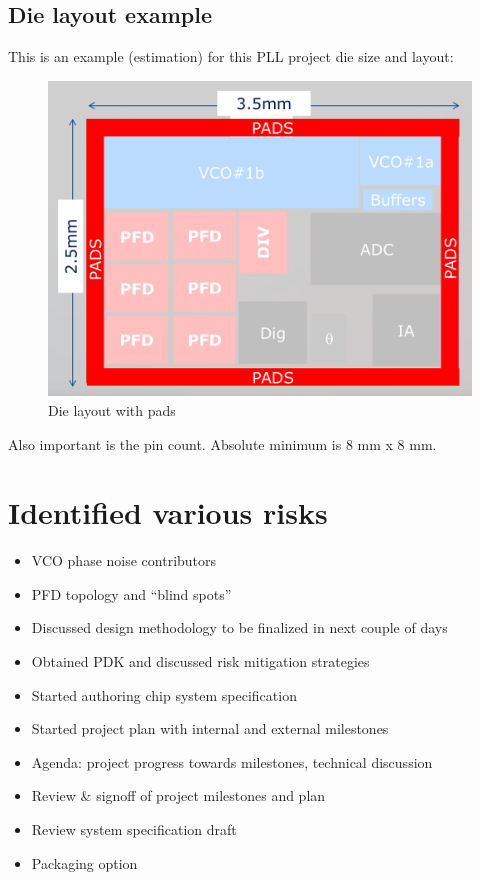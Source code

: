 \documentclass{article}
\begin{document}
\subsection{Die layout example}

This is an example (estimation) for this PLL project die size and layout:

\begin{figure}[ht!]
	\centering %
	\includegraphics[width=0.5\linewidth]{Figures/die-size-with-pads.png}
	\caption{Die layout with pads }
	\label{fig:die-size-with-pads}
\end{figure}

Also important is the pin count. Absolute minimum is 8 mm x 8 mm.

\section{Identified various risks} %

\begin{itemize}
	\item VCO phase noise contributors
	\item PFD topology and “blind spots” %
	\item Discussed design methodology to be finalized in next couple of days
	\item Obtained PDK and discussed risk mitigation strategies %
	\item Started authoring chip system specification
	\item Started project plan with internal and external milestones
	\item Agenda: project progress towards milestones, technical discussion
	\item Review \& signoff of project milestones and plan
	\item Review system specification draft 
	\item Packaging option
\end{itemize}
\end{document}
